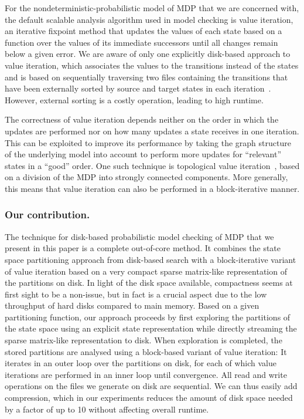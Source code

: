 \documentclass{llncs}
\begin{document}
For the nondeterministic-probabilistic model of MDP that we are concerned with, the default scalable analysis algorithm used in model checking is value iteration, an iterative fixpoint method that updates the values of each state based on a function over the values of its immediate successors until all changes remain below a given error.
We are aware of only one explicitly disk-based approach to value iteration, which associates the values to the transitions instead of the states and is based on sequentially traversing two files containing the transitions that have been externally sorted by source and target states in each iteration~\cite{EJB07}.
However, external sorting is a costly operation, leading to high runtime.

The correctness of value iteration depends neither on the order in which the updates are performed nor on how many updates a state receives in one iteration.
This can be exploited to improve its performance by taking the graph structure of the underlying model into account to perform more updates for ``relevant'' states in a ``good'' order.
One such technique is topological value iteration~\cite{DG07}, based on a division of the MDP into strongly connected components.
More generally, this means that value iteration can also be performed in a block-iterative manner.


\subsubsection{Our contribution.}
The technique for disk-based probabilistic model checking of MDP that
we present in this paper is a complete out-of-core method.  It
combines the state space partitioning approach from disk-based search
with a block-iterative variant of value iteration based on a very
compact sparse matrix-like representation of the partitions on disk.
In light of the disk space available, compactness seems at first sight
to be a non-issue, but in fact is a crucial aspect due to the low throughput of hard disks compared to main memory. Based on a given partitioning function, our approach proceeds by first exploring the partitions of the state space using an explicit state representation while directly streaming the sparse matrix-like representation to disk.
When exploration is completed, the stored partitions are analysed using a block-based variant of value iteration:
It iterates in an outer loop over the partitions on disk, for each of which value iterations are performed in an inner loop until convergence.
All read and write operations on the files we generate on disk are sequential.
We can thus easily add compression, which in our experiments reduces the amount of disk space needed by a factor of up to 10 without affecting overall runtime.
\end{document}
